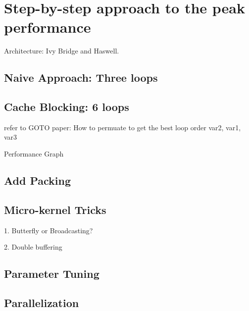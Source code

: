 
\section{Step-by-step approach to the peak performance}
Architecture: Ivy Bridge and Haswell.

\subsection{Naive Approach: Three loops}


\subsection{Cache Blocking: 6 loops}


refer to GOTO paper: How to permuate to get the best loop order
var2, var1, var3


Performance Graph

\subsection{Add Packing}


\subsection{Micro-kernel Tricks}
1. Butterfly or Broadcasting?

2. Double buffering


\subsection{Parameter Tuning}



\subsection{Parallelization}







